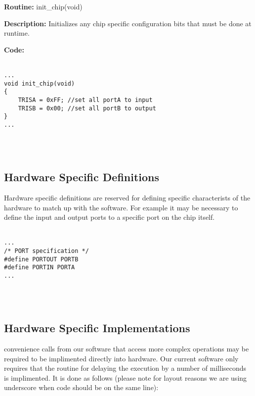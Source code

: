 \textbf{Routine:} init\_chip(void)

\textbf{Description:} Initializes any chip specific configuration bits that must be done at runtime.

\textbf{Code:}
\\
\\
\begin{minipage}{\textwidth}
\begin{lstlisting}[frame=single]
...
void init_chip(void)
{	
	TRISA = 0xFF; //set all portA to input
	TRISB = 0x00; //set all portB to output
}
...
\end{lstlisting}
\end{minipage}
\\
\\
\subsection{Hardware Specific Definitions}

Hardware specific definitions are reserved for defining specific characterists of the hardware to match up with the software. For example it may be necessary to define the input and output ports to a specific port on the chip itself.
\\
\\
\begin{minipage}{\textwidth}
\begin{lstlisting}[frame=single]
...
/* PORT specification */
#define PORTOUT PORTB
#define PORTIN PORTA
...
\end{lstlisting}
\end{minipage}
\\
\\
\subsection{Hardware Specific Implementations}

convenience calls from our software that access more complex operations may be required to be implimented directly into hardware. Our current software only requires that the routine for delaying the execution by a number of milliseconds is implimented. It is done as follows (please note for layout reasons we are using underscore when code should be on the same line):

